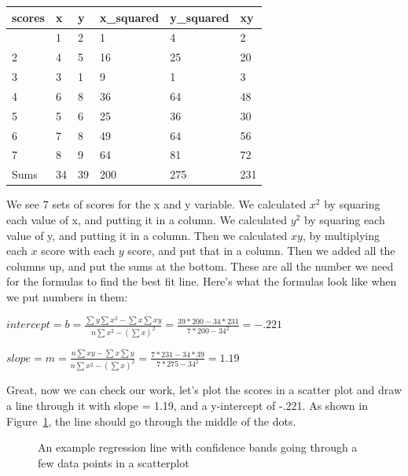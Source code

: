 \documentclass[
  letterpaper,
  DIV=11,
  numbers=noendperiod]{scrreprt}
\begin{document}
\begin{longtable}[]{@{}llllll@{}}
\toprule\noalign{}
scores & x & y & x\_squared & y\_squared & xy \\
\midrule\noalign{}
\endhead
\bottomrule\noalign{}
\endlastfoot
1 & 1 & 2 & 1 & 4 & 2 \\
2 & 4 & 5 & 16 & 25 & 20 \\
3 & 3 & 1 & 9 & 1 & 3 \\
4 & 6 & 8 & 36 & 64 & 48 \\
5 & 5 & 6 & 25 & 36 & 30 \\
6 & 7 & 8 & 49 & 64 & 56 \\
7 & 8 & 9 & 64 & 81 & 72 \\
Sums & 34 & 39 & 200 & 275 & 231 \\
\end{longtable}

We see 7 sets of scores for the x and y variable. We calculated \(x^2\)
by squaring each value of x, and putting it in a column. We calculated
\(y^2\) by squaring each value of y, and putting it in a column. Then we
calculated \(xy\), by multiplying each \(x\) score with each \(y\)
score, and put that in a column. Then we added all the columns up, and
put the sums at the bottom. These are all the number we need for the
formulas to find the best fit line. Here's what the formulas look like
when we put numbers in them:

\(intercept = b = \frac{\sum{y}\sum{x^2}-\sum{x}\sum{xy}}{n\sum{x^2}-(\sum{x})^2} = \frac{39 * 200 - 34*231}{7*200-34^2} = -.221\)

\(slope = m = \frac{n\sum{xy}-\sum{x}\sum{y}}{n\sum{x^2}-(\sum{x})^2} = \frac{7*231-34*39}{7*275-34^2} = 1.19\)

Great, now we can check our work, let's plot the scores in a scatter
plot and draw a line through it with slope = 1.19, and a y-intercept of
-.221. As shown in Figure~\ref{fig-3corwithLine}, the line should go
through the middle of the dots.

\begin{figure}


\caption{\label{fig-3corwithLine}An example regression line with
confidence bands going through a few data points in a scatterplot}

\end{figure}%
\end{document}
